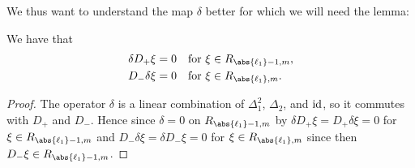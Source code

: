 We thus want to understand the map $\delta$ better for which we will need the lemma:

\begin{lemma}
  We have that
  \begin{align}
    \begin{aligned}
      \delta D_+ \xi &= 0 && \text{for }\xi\in R_{\abs{\ell_1}-1,m},\\
      D_-\delta \xi &= 0 && \text{for }\xi\in R_{\abs{\ell_1},m}.
    \end{aligned}
  \end{align}
\end{lemma}
\begin{proof}
  The operator $\delta$ is a linear combination of $\Delta_1^2$, $\Delta_2$, and $\operatorname{id}$, so it commutes with $D_+$ and $D_-$. Hence since $\delta=0$ on $R_{\abs{\ell_1}-1,m}$ by  $\delta D_+ \xi = D_+\delta \xi = 0$ for $\xi\in R_{\abs{\ell_1}-1,m}$ and $D_-\delta \xi = \delta D_-\xi = 0$ for $\xi \in R_{\abs{\ell_1},m}$ since then $D_-\xi\in R_{\abs{\ell_1}-1,m}$.
\end{proof}

